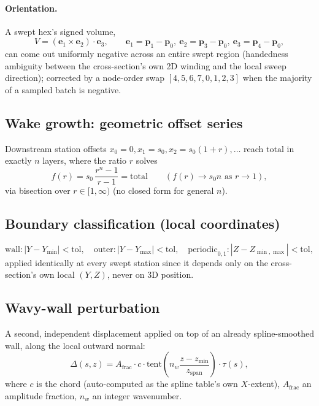 \documentclass[11pt]{article}
\newcommand{\vecb}[1]{\bm{#1}}
\begin{document}
\paragraph{Orientation.} A swept hex's signed volume,
\begin{equation}
V = (\vecb{e}_1 \times \vecb{e}_2)\cdot \vecb{e}_3, \qquad
\vecb{e}_1 = \vecb{p}_1-\vecb{p}_0,\ \vecb{e}_2=\vecb{p}_3-\vecb{p}_0,\ \vecb{e}_3=\vecb{p}_4-\vecb{p}_0,
\end{equation}
can come out uniformly negative across an entire swept region
(handedness ambiguity between the cross-section's own 2D winding and
the local sweep direction); corrected by a node-order swap
\([4,5,6,7,0,1,2,3]\) when the majority of a sampled batch is negative.

\subsection{Wake growth: geometric offset series}
\label{sec:wake-growth}
Downstream station offsets \(x_0=0, x_1=s_0, x_2=s_0(1+r), \dots\)
reach \(\text{total}\) in exactly \(n\) layers, where the ratio \(r\)
solves
\begin{equation}
f(r) = s_0\,\frac{r^n - 1}{r-1} = \text{total} \qquad (f(r)\to s_0 n \text{ as } r\to1),
\end{equation}
via bisection over \(r\in[1,\infty)\) (no closed form for general
\(n\)).

\subsection{Boundary classification (local coordinates)}
\begin{equation}
\text{wall}: |Y-Y_{\min}|<\text{tol}, \quad
\text{outer}: |Y-Y_{\max}|<\text{tol}, \quad
\text{periodic}_{0,1}: |Z-Z_{\min,\max}|<\text{tol},
\end{equation}
applied identically at every swept station since it depends only on
the cross-section's own local \((Y,Z)\), never on 3D position.

\subsection{Wavy-wall perturbation}
\label{sec:wavy-wall}
A second, independent displacement applied on top of an already
spline-smoothed wall, along the local outward normal:
\begin{equation}
\Delta(s,z) = A_{\text{frac}}\cdot c \cdot \mathrm{tent}\!\left(n_w\frac{z-z_{\min}}{z_{\text{span}}}\right)\cdot \tau(s),
\end{equation}
where \(c\) is the chord (auto-computed as the spline table's own
\(X\)-extent), \(A_{\text{frac}}\) an amplitude fraction, \(n_w\) an
integer wavenumber.
\end{document}

